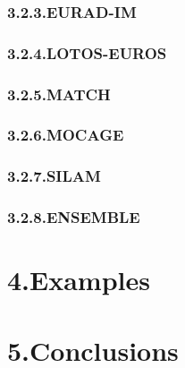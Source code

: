 \documentclass[9pt]{report}
\begin{document}
\subsubsection{3.2.3.\hspace*{0.5em}EURAD-IM}\label{sec-eurad-im}%

\subsubsection{3.2.4.\hspace*{0.5em}LOTOS-EUROS}\label{sec-lotos-euros}%

\subsubsection{3.2.5.\hspace*{0.5em}MATCH}\label{sec-match}%

\subsubsection{3.2.6.\hspace*{0.5em}MOCAGE}\label{sec-mocage}%

\subsubsection{3.2.7.\hspace*{0.5em}SILAM}\label{sec-silam}%

\subsubsection{3.2.8.\hspace*{0.5em}ENSEMBLE}\label{sec-ensemble}%

\section{4.\hspace*{0.5em}Examples}\label{sec-examples}%

\section{5.\hspace*{0.5em}Conclusions}\label{sec-conclusions}%
\end{document}
